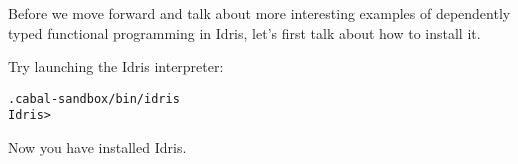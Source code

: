 Before we move forward and talk about more interesting examples of dependently typed functional
programming in Idris, let's first talk about how to install it.




Try launching the Idris interpreter:
\begin{lstlisting}
.cabal-sandbox/bin/idris
Idris>
\end{lstlisting}
Now you have installed Idris.
